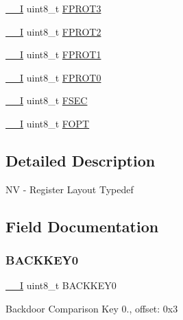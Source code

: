 \begin{DoxyCompactItemize}
\mbox{\hyperlink{core__cm0plus_8h_af63697ed9952cc71e1225efe205f6cd3}{\+\_\+\+\_\+I}} uint8\+\_\+t \mbox{\hyperlink{struct_n_v___type_ae95f76fe298558644b1a5c8acc1cdf3a}{F\+P\+R\+O\+T3}}
\item 
\mbox{\hyperlink{core__cm0plus_8h_af63697ed9952cc71e1225efe205f6cd3}{\+\_\+\+\_\+I}} uint8\+\_\+t \mbox{\hyperlink{struct_n_v___type_ae87543688ebb5c30285916eaa270c014}{F\+P\+R\+O\+T2}}
\item 
\mbox{\hyperlink{core__cm0plus_8h_af63697ed9952cc71e1225efe205f6cd3}{\+\_\+\+\_\+I}} uint8\+\_\+t \mbox{\hyperlink{struct_n_v___type_ae00ef9e85bce41b17b8c85e226bfeadb}{F\+P\+R\+O\+T1}}
\item 
\mbox{\hyperlink{core__cm0plus_8h_af63697ed9952cc71e1225efe205f6cd3}{\+\_\+\+\_\+I}} uint8\+\_\+t \mbox{\hyperlink{struct_n_v___type_a060054d1f5f54bb8a55d0eeb7cd8ae29}{F\+P\+R\+O\+T0}}
\item 
\mbox{\hyperlink{core__cm0plus_8h_af63697ed9952cc71e1225efe205f6cd3}{\+\_\+\+\_\+I}} uint8\+\_\+t \mbox{\hyperlink{struct_n_v___type_a9c289cf99054de8442c0847062613f18}{F\+S\+EC}}
\item 
\mbox{\hyperlink{core__cm0plus_8h_af63697ed9952cc71e1225efe205f6cd3}{\+\_\+\+\_\+I}} uint8\+\_\+t \mbox{\hyperlink{struct_n_v___type_a4a588e9f6d971bfa0ec727d08935c72e}{F\+O\+PT}}
\end{DoxyCompactItemize}


\subsection{Detailed Description}
NV -\/ Register Layout Typedef 

\subsection{Field Documentation}
\mbox{\label{struct_n_v___type_aa0da3d6ede3a90b0697a300ddf18cd65}} 
\subsubsection{\texorpdfstring{BACKKEY0}{BACKKEY0}}
{\footnotesize\ttfamily \mbox{\hyperlink{core__cm0plus_8h_af63697ed9952cc71e1225efe205f6cd3}{\+\_\+\+\_\+I}} uint8\+\_\+t B\+A\+C\+K\+K\+E\+Y0}

Backdoor Comparison Key 0., offset\+: 0x3 \mbox{\label{struct_n_v___type_a42fa40dda0fa3aee0b861bdf6ffa1eae}} 
